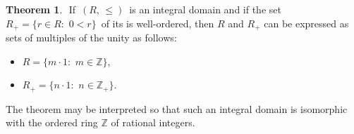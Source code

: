\documentclass[12pt]{article}
\theoremstyle{definition}
\newtheorem*{thmplain}{Theorem}
\begin{document}
\begin{thmplain}
\,\,If \,$(R,\,\leq)$\, is an  integral domain and if the set\, $R_+ = \{r\in R: \,\,0 < r\}$\, of its  is well-ordered, then $R$ and $R_+$ can be expressed as sets of multiples of the unity as follows:
\begin{itemize}
 \item $R   = \{m\cdot 1: \,\,m\in\mathbb{Z}\}$,
 \item $R_+ = \{n\cdot 1: \,\,n\in\mathbb{Z}_+\}$.
\end{itemize}
\end{thmplain}

The theorem may be interpreted so that such an integral domain is isomorphic with the ordered ring $\mathbb{Z}$ of rational integers.
\end{document}
